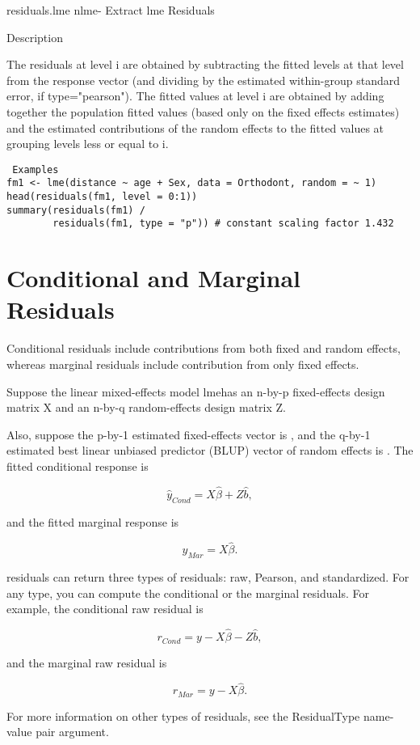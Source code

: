 

residuals.lme {nlme}- Extract lme Residuals

Description

The residuals at level i are obtained by subtracting the fitted levels at that level from the response vector (and dividing by the estimated within-group standard error, if type="pearson"). The fitted values at level i are obtained by adding together the population fitted values (based only on the fixed effects estimates) and the estimated contributions of the random effects to the fitted values at grouping levels less or equal to i.
 
 
 \begin{framed}
 \begin{verbatim}
 Examples
fm1 <- lme(distance ~ age + Sex, data = Orthodont, random = ~ 1)
head(residuals(fm1, level = 0:1))
summary(residuals(fm1) /
        residuals(fm1, type = "p")) # constant scaling factor 1.432

\end{verbatim}
\end{framed}


\section*{Conditional and Marginal Residuals}

Conditional residuals include contributions from both fixed and random effects, whereas marginal residuals include contribution from only fixed effects.

Suppose the linear mixed-effects model lmehas an n-by-p fixed-effects design matrix X and an n-by-q random-effects design matrix Z. 

Also, suppose the p-by-1 estimated fixed-effects vector is \hat{\beta}, and the q-by-1 estimated best linear unbiased predictor (BLUP) vector of random effects is . The fitted conditional response is

\[ \hat{y}_{Cond} = X\hat{\beta}+Z\hat{b},\]

and the fitted marginal response is

\[ \hat{y}_{Mar} = X\hat{\beta}.\]

residuals can return three types of residuals: raw, Pearson, and standardized. For any type, you can compute the conditional or the marginal residuals. For example, the conditional raw residual is

\[ r_{Cond} = y−X\hat{\beta}−Z\hat{b},\]

and the marginal raw residual is 

\[ r_{Mar} = y−X\hat{\beta}.\]

For more information on other types of residuals, see the ResidualType name-value pair argument.

